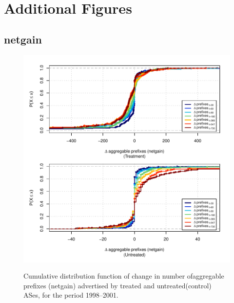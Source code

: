 \chapter{Additional Figures}
\label{chap:additional_figs}

\section{netgain}

\begin{figure}[H]
\begin{centering}
\begin{singlespace}
    \includegraphics[width=6in]{figures/behavior-netgain-1998_2001-corr.pdf}
    \vspace{-2em}\\
    \caption{Cumulative distribution function of change in number ofaggregable
    prefixes (netgain) advertised by treated and untreated(control) ASes, for
    the period 1998--2001.}
\end{singlespace}
\end{centering}
\end{figure}
